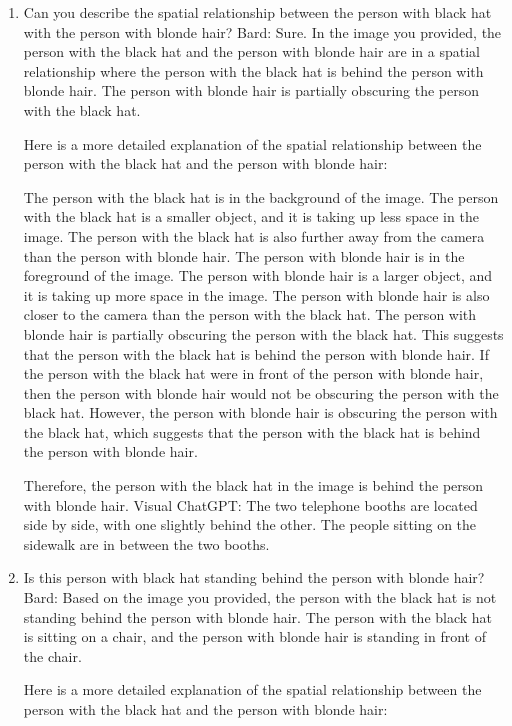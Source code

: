 \begin{enumerate}
    \item Can you describe the spatial relationship between the person with black hat with the person with blonde hair?
    \subitem Bard: 
    Sure. In the image you provided, the person with the black hat and the person with blonde hair are in a spatial relationship where the person with the black hat is behind the person with blonde hair. The person with blonde hair is partially obscuring the person with the black hat.
    
    Here is a more detailed explanation of the spatial relationship between the person with the black hat and the person with blonde hair:
    
    The person with the black hat is in the background of the image. The person with the black hat is a smaller object, and it is taking up less space in the image. The person with the black hat is also further away from the camera than the person with blonde hair.
    The person with blonde hair is in the foreground of the image. The person with blonde hair is a larger object, and it is taking up more space in the image. The person with blonde hair is also closer to the camera than the person with the black hat.
    The person with blonde hair is partially obscuring the person with the black hat. This suggests that the person with the black hat is behind the person with blonde hair.
    If the person with the black hat were in front of the person with blonde hair, then the person with blonde hair would not be obscuring the person with the black hat. However, the person with blonde hair is obscuring the person with the black hat, which suggests that the person with the black hat is behind the person with blonde hair.
    
    Therefore, the person with the black hat in the image is behind the person with blonde hair.     
    \subitem Visual ChatGPT: The two telephone booths are located side by side, with one slightly behind the other. The people sitting on the sidewalk are in between the two booths.
    \item Is this person with black hat standing behind the person with blonde hair?
    \subitem Bard: 
    Based on the image you provided, the person with the black hat is not standing behind the person with blonde hair. The person with the black hat is sitting on a chair, and the person with blonde hair is standing in front of the chair.
    
    Here is a more detailed explanation of the spatial relationship between the person with the black hat and the person with blonde hair:
    

\end{enumerate}
